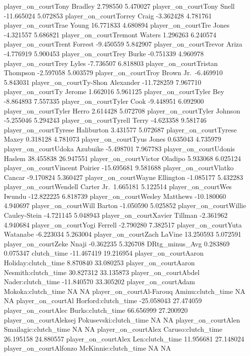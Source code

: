 \documentclass[
  landscape]{article}
\begin{document}
player\_on\_courtTony Bradley 2.798550 5.470027 player\_on\_courtTony
Snell -11.665024 5.072853 player\_on\_courtTorrey Craig -3.362428
4.781761 player\_on\_courtTrae Young 16.771833 4.680894
player\_on\_courtTre Jones -4.321557 5.686821 player\_on\_courtTremont
Waters 1.296263 6.240574 player\_on\_courtTrent Forrest -9.450559
5.842907 player\_on\_courtTrevor Ariza -4.776919 5.900453
player\_on\_courtTrey Burke -0.751339 4.960978 player\_on\_courtTrey
Lyles -7.736507 6.818803 player\_on\_courtTristan Thompson -2.597058
5.003579 player\_on\_courtTroy Brown Jr.~-6.469910 5.843031
player\_on\_courtTy-Shon Alexander -11.728259 7.967710
player\_on\_courtTy Jerome 1.662016 5.961125 player\_on\_courtTyler Bey
-8.864893 7.557335 player\_on\_courtTyler Cook -9.448951 6.092900
player\_on\_courtTyler Herro 2.614428 5.072708 player\_on\_courtTyler
Johnson -5.255046 5.294243 player\_on\_courtTyrell Terry -4.623358
9.581746 player\_on\_courtTyrese Haliburton 3.431577 5.072687
player\_on\_courtTyrese Maxey 0.318128 4.781073 player\_on\_courtTyus
Jones 0.635043 4.735979 player\_on\_courtUdoka Azubuike -5.498701
7.967783 player\_on\_courtUdonis Haslem 38.455838 26.947551
player\_on\_courtVictor Oladipo 5.933068 6.025124
player\_on\_courtVincent Poirier -15.695681 9.581688
player\_on\_courtVlatko Cancar -9.170824 5.360427 player\_on\_courtWayne
Ellington -1.085177 5.432283 player\_on\_courtWendell Carter
Jr.~1.665181 5.122514 player\_on\_courtWes Iwundu -12.822225 6.818739
player\_on\_courtWesley Matthews -10.180060 4.940697
player\_on\_courtWill Barton -1.050590 5.025852 player\_on\_courtWillie
Cauley-Stein -4.721145 5.048943 player\_on\_courtXavier Tillman
-2.361962 4.940684 player\_on\_courtYogi Ferrell -2.790280 7.382517
player\_on\_courtYuta Watanabe -6.223034 5.263004 player\_on\_courtZach
LaVine 13.250593 5.072591 player\_on\_courtZeke Nnaji -0.362235 5.326708
DRtg\_minus\_Avg 0.283869 0.075347 clutch\_time -11.467419 19.216954
player\_on\_courtAaron Holiday:clutch\_time 8.870840 33.080253
player\_on\_courtAaron Nesmith:clutch\_time 30.827312 33.135873
player\_on\_courtAbdel Nader:clutch\_time -11.840570 33.305202
player\_on\_courtAdam Mokoka:clutch\_time NA NA
player\_on\_courtAl-Farouq Aminu:clutch\_time NA NA player\_on\_courtAl
Horford:clutch\_time -25.058043 27.474059 player\_on\_courtAlec
Burks:clutch\_time 66.656999 27.200920 player\_on\_courtAleksej
Pokusevski:clutch\_time NA NA player\_on\_courtAlen
Smailagic:clutch\_time NA NA player\_on\_courtAlex Caruso:clutch\_time
26.195158 24.880557 player\_on\_courtAlex Len:clutch\_time 11.956681
27.148024 player\_on\_courtAlfonzo McKinnie:clutch\_time NA NA
\end{document}
